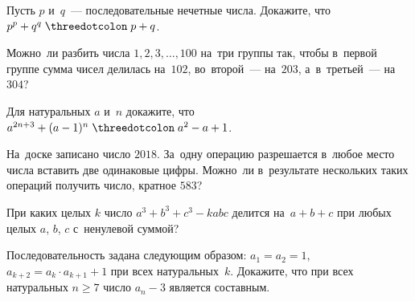 \begin{problems}
\item
Пусть $p$ и~$q$~--- последовательные нечетные числа.
Докажите, что $p^{p} + q^{q} \kratno p + q$.

\item
Можно~ли разбить числа $1, 2, 3, \ldots, 100$ на~три группы так, чтобы в~первой
группе сумма чисел делилась на~$102$, во~второй~--- на~$203$, а~в~третьей~---
на~$304$?


\item
Для натуральных $a$ и~$n$ докажите, что
$a^{2n+3} + (a - 1)^{n} \kratno a^2 - a + 1$.


\item
На~доске записано число $2018$.
За~одну операцию разрешается в~любое место числа вставить две одинаковые цифры.
Можно~ли в~результате нескольких таких операций получить число, кратное $583$?

\item
При каких целых $k$ число $a^3 + b^3 + c^3 - k a b c$ делится на~$a + b + c$
при любых целых $a$, $b$, $c$ с~ненулевой суммой?

\item
Последовательность задана следующим образом:
$a_{1} = a_{2} = 1$, $a_{k+2} = a_{k} \cdot a_{k+1} + 1$ при всех
натуральных~$k$.
Докажите, что при всех натуральных $n \geq 7$ число $a_{n} - 3$ является
составным.

\end{problems}

\endgroup %

